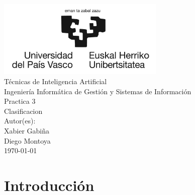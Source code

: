 \documentclass{report}
\begin{document}
  \begin{titlepage}
      \centering
      \includegraphics[width=0.6\textwidth]{./.img/logo.jpg}\\
      \vspace{1cm}
      \LARGE Técnicas de Inteligencia Artificial\\
      \vspace{0.5cm}
      \Large Ingeniería Informática de Gestión y Sistemas de Información\\
      \vspace{3cm}
      \Huge Practica 3\\
      \huge Clasificacion\\
      \vspace{2.5cm}
      \Large Autor(es):\\
      \vspace{0.2cm}
      \large Xabier Gabiña\\
      \large Diego Montoya\\
      \vfill
      \today
  \end{titlepage}
  \tableofcontents
  \listoffigures
  \lstlistoflistings
  \chapter{Introducción}
\end{document}
